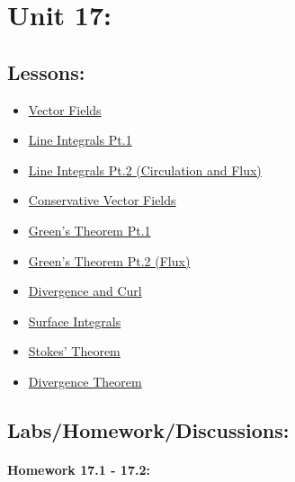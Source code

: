 \documentclass[9pt]{amsart}
\begin{document}
\section{Unit 17:}
    \subsection{Lessons:}
        \begin{itemize}
            \item \href{https://www.youtube.com/watch?v=qD6xUP-1-DY&list=PLVOT1I6lLvjfDhACPSMXam2diM0IBR3hl&index=31}{Vector Fields}
            \item \href{https://www.youtube.com/watch?v=sUYdWoHrI2g&list=PLVOT1I6lLvjfDhACPSMXam2diM0IBR3hl&index=32}{Line Integrals Pt.1}
            \item \href{https://www.youtube.com/watch?v=mJoq7zZWGoA&list=PLVOT1I6lLvjfDhACPSMXam2diM0IBR3hl&index=33}{Line Integrals Pt.2 (Circulation and Flux)}
            \item \href{https://www.youtube.com/watch?v=aovijT468Mc&list=PLVOT1I6lLvjfDhACPSMXam2diM0IBR3hl&index=34}{Conservative Vector Fields}
            \item \href{https://www.youtube.com/watch?v=cXIXR8sEJaA&list=PLVOT1I6lLvjfDhACPSMXam2diM0IBR3hl&index=35}{Green's Theorem Pt.1}
            \item \href{https://www.youtube.com/watch?v=z2-6KgQEjH8&list=PLVOT1I6lLvjfDhACPSMXam2diM0IBR3hl&index=36}{Green's Theorem Pt.2 (Flux)}
            \item \href{https://www.youtube.com/watch?v=n0bVPtiJ2nE&list=PLVOT1I6lLvjfDhACPSMXam2diM0IBR3hl&index=37}{Divergence and Curl}
            \item \href{https://www.youtube.com/watch?v=GbFP_fLCu7w&list=PLVOT1I6lLvjfDhACPSMXam2diM0IBR3hl&index=38}{Surface Integrals}
            \item \href{https://www.youtube.com/watch?v=55ibSTgi7AY&list=PLVOT1I6lLvjfDhACPSMXam2diM0IBR3hl&index=41}{Stokes' Theorem}
            \item \href{https://www.youtube.com/watch?v=2l9DUwTx9hE&list=PLVOT1I6lLvjfDhACPSMXam2diM0IBR3hl&index=39}{Divergence Theorem}
        \end{itemize}
    
    \subsection{Labs/Homework/Discussions:}
        \paragraph{Homework 17.1 - 17.2:}
            
\end{document}
